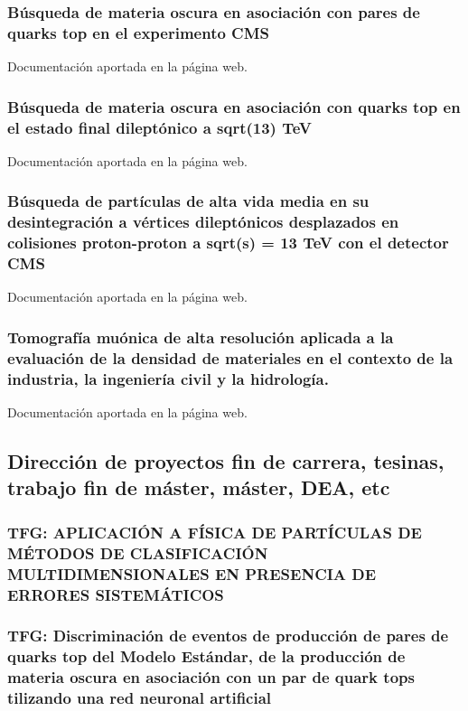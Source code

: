 \documentclass[a4paper, 11pt, twoside, openright]{report}
\begin{document}
\subsubsection{Búsqueda de materia oscura en asociación con pares de quarks top en el experimento CMS}
%
Documentación aportada en la página web.
\subsubsection{Búsqueda de materia oscura en asociación con quarks top en el estado final dileptónico a sqrt(13) TeV}
%
Documentación aportada en la página web.
\subsubsection{Búsqueda de partículas de alta vida media en su desintegración a vértices dileptónicos desplazados en colisiones proton-proton a sqrt(s) = 13 TeV con el detector CMS}
%
Documentación aportada en la página web.
\subsubsection{Tomografía muónica de alta resolución aplicada a la evaluación de la densidad de materiales en el contexto de la industria, la ingeniería civil y la hidrología.}
%
Documentación aportada en la página web.




\subsection{Dirección de proyectos fin de carrera, tesinas, trabajo fin de máster, máster, DEA, etc}

\subsubsection{TFG: APLICACIÓN A FÍSICA DE PARTÍCULAS DE MÉTODOS DE CLASIFICACIÓN MULTIDIMENSIONALES EN PRESENCIA DE ERRORES SISTEMÁTICOS}


\subsubsection{TFG: Discriminación de eventos de producción de pares de quarks top del Modelo Estándar, de la producción de materia oscura en asociación con un par de quark tops tilizando una red neuronal artificial}

\end{document}
